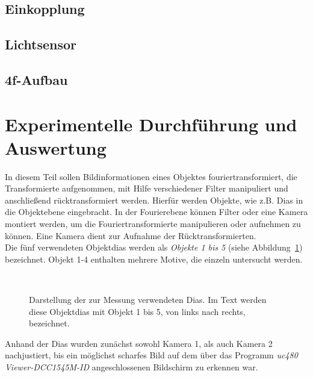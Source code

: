 \documentclass[12pt,a4paper]{article}
\begin{document}
	\subsection{Einkopplung}
	
	\subsection{Lichtsensor}
	
	\subsection{4f-Aufbau}
	
	\label{chap:abb+ft}
		
		
	\section{Experimentelle Durchführung und Auswertung}
	\label{chap:auswertung}
	In diesem Teil sollen Bildinformationen eines Objektes fouriertransformiert, die Transformierte aufgenommen, mit Hilfe verschiedener Filter manipuliert und anschließend rücktransformiert werden. Hierfür werden Objekte, wie z.B. Dias in die Objektebene eingebracht. In der Fourierebene können  Filter oder eine Kamera montiert werden, um die Fouriertransformierte manipulieren oder aufnehmen zu können. Eine Kamera dient zur Aufnahme der Rücktransformierten.\\
	
	Die fünf verwendeten Objektdias werden als \textit{Objekte 1 bis 5} (siehe Abbildung~\ref{fig:Objekte-aus-Anleitungsheft}) bezeichnet. Objekt 1-4 enthalten mehrere Motive, die einzeln untersucht werden.
	
	\begin{figure}[h]
		\centering
		~~
		~~
		~~
		~~
		\caption[Die zur Messung verwendeten Diamotive]{
			Darstellung der zur Messung verwendeten Dias. Im Text werden diese Objektdias mit Objekt 1 bis 5, von links nach rechts, bezeichnet.
		}
		\label{fig:Objekte-aus-Anleitungsheft}
	\end{figure}
	
	Anhand der Dias wurden zunächst sowohl Kamera 1, als auch Kamera 2 nachjustiert, bis ein möglichst scharfes Bild auf dem über das Programm \textit{uc480 Viewer-DCC1545M-ID} angeschlossenen Bildschirm zu erkennen war. %
		
\end{document}
